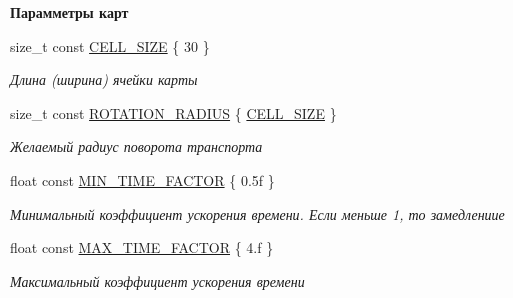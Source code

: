 \begin{Indent}\textbf{ Парамметры карт}\par
\begin{DoxyCompactItemize}
\item 
\mbox{\label{namespacertm_a65de3c23461f4c4c935a5bb6e8a09732}} 
size\+\_\+t const \hyperlink{namespacertm_a65de3c23461f4c4c935a5bb6e8a09732}{C\+E\+L\+L\+\_\+\+S\+I\+ZE} \{ 30 \}
\begin{DoxyCompactList}\small\item\em Длина (ширина) ячейки карты \end{DoxyCompactList}\item 
\mbox{\label{namespacertm_ad5621a798daeaed275db0f01f62dc031}} 
size\+\_\+t const \hyperlink{namespacertm_ad5621a798daeaed275db0f01f62dc031}{R\+O\+T\+A\+T\+I\+O\+N\+\_\+\+R\+A\+D\+I\+US} \{ \hyperlink{namespacertm_a65de3c23461f4c4c935a5bb6e8a09732}{C\+E\+L\+L\+\_\+\+S\+I\+ZE} \}
\begin{DoxyCompactList}\small\item\em Желаемый радиус поворота транспорта \end{DoxyCompactList}\item 
\mbox{\label{namespacertm_a242868592bdb0f0d14e93f7d25ed614e}} 
float const \hyperlink{namespacertm_a242868592bdb0f0d14e93f7d25ed614e}{M\+I\+N\+\_\+\+T\+I\+M\+E\+\_\+\+F\+A\+C\+T\+OR} \{ 0.\+5f \}
\begin{DoxyCompactList}\small\item\em Минимальный коэффициент ускорения времени. Если меньше 1, то замедлениие \end{DoxyCompactList}\item 
\mbox{\label{namespacertm_aca8c6c8fc95ff25eefdd5a0c902426b7}} 
float const \hyperlink{namespacertm_aca8c6c8fc95ff25eefdd5a0c902426b7}{M\+A\+X\+\_\+\+T\+I\+M\+E\+\_\+\+F\+A\+C\+T\+OR} \{ 4.f \}
\begin{DoxyCompactList}\small\item\em Максимальный коэффициент ускорения времени \end{DoxyCompactList}\end{DoxyCompactItemize}
\end{Indent}
